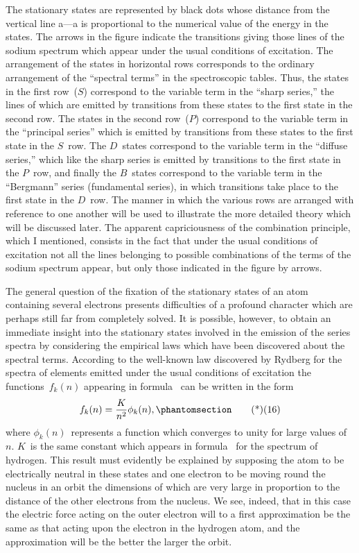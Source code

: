 The stationary states are represented by black dots whose distance
from the vertical line a---a is proportional to the numerical value
of the energy in the states. The arrows in the figure indicate the
transitions giving those lines of the sodium spectrum which appear
under the usual conditions of excitation. The arrangement of the
states in horizontal rows corresponds to the ordinary arrangement
of the ``spectral terms'' in the spectroscopic tables. Thus, the states
in the first row~($S$) correspond to the variable term in the ``sharp
series,'' the lines of which are emitted by transitions from these
states to the first state in the second row. The states in the second
row~($P$) correspond to the variable term in the ``principal series''
which is emitted by transitions from these states to the first state
in the $S$~row. The $D$~states correspond to the variable term in the
``diffuse series,'' which like the sharp series is emitted by transitions
to the first state in the $P$~row, and finally the $B$~states correspond
to the variable term in the ``Bergmann'' series (fundamental series),
in which transitions take place to the first state in the $D$~row. The
manner in which the various rows are arranged with reference to
one another will be used to illustrate the more detailed theory
which will be discussed later. The apparent capriciousness of the
combination principle, which I mentioned, consists in the fact that
under the usual conditions of excitation not all the lines belonging
to possible combinations of the terms of the sodium spectrum appear,
but only those indicated in the figure by arrows.

The general question of the fixation of the stationary states of
an atom containing several electrons presents difficulties of a profound
character which are perhaps still far from completely solved.
It is possible, however, to obtain an immediate insight into the
stationary states involved in the emission of the series spectra by
considering the empirical laws which have been discovered about
the spectral terms. According to the well-known law discovered by
Rydberg for the spectra of elements emitted under the usual conditions
of excitation the functions~$f_{k}(n)$ appearing in formula~
can be written in the form
\[
f_{k}(n) = \frac{K}{n^{2}} \phi_{k}(n),
\Tag{(16)}
\]
where $\phi_{k}(n)$~represents a function which converges to unity for
large values of~$n$. $K$~is the same constant which appears in formula~
for the spectrum of hydrogen. This result must evidently be
explained by supposing the atom to be electrically neutral in these
states and one electron to be moving round the nucleus in an orbit
the dimensions of which are very large in proportion to the distance
of the other electrons from the nucleus. We see, indeed, that in
this case the electric force acting on the outer electron will to a
first approximation be the same as that acting upon the electron
in the hydrogen atom, and the approximation will be the better
the larger the orbit.


